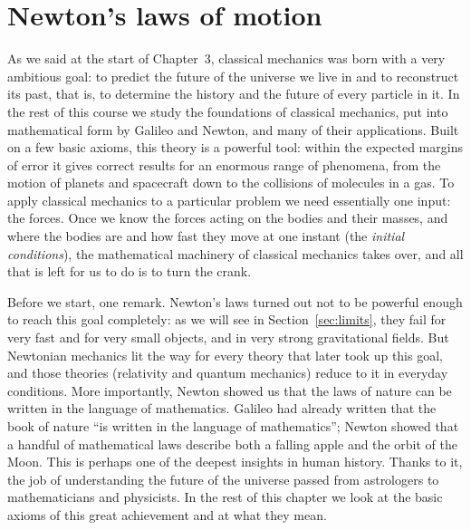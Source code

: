 \documentclass[11pt,a4paper]{article}
\begin{document}
\makenotetitle

\setcounter{section}{4}
\section{Newton's laws of motion}\label{sec:newton}

As we said at the start of Chapter~3, classical mechanics was born with a very ambitious goal: to
predict the future of the universe we live in and to reconstruct its past, that is, to determine
the history and the future of every particle in it. In the rest of this course we study the
foundations of classical mechanics, put into mathematical form by Galileo and Newton, and many of
their applications. Built on a few basic axioms, this theory is a powerful tool: within the
expected margins of error it gives correct results for an enormous range of phenomena, from the
motion of planets and spacecraft down to the collisions of molecules in a gas. To apply classical
mechanics to a particular problem we need essentially one input: the forces. Once we know the
forces acting on the bodies and their masses, and where the bodies are and how fast they move at
one instant (the \emph{initial conditions}), the mathematical machinery of classical mechanics takes
over, and all that is left for us to do is to turn the crank.

Before we start, one remark. Newton's laws turned out not to be powerful enough to reach this goal
completely: as we will see in Section~\ref{sec:limits}, they fail for very fast and for very small
objects, and in very strong gravitational fields. But Newtonian mechanics lit the way for every
theory that later took up this goal, and those theories (relativity and quantum mechanics) reduce
to it in everyday conditions. More
importantly, Newton showed us that the laws of nature can be written in the language of
mathematics. Galileo had already written that the book of nature ``is written in the language of
mathematics''; Newton showed that a handful of mathematical laws describe both a falling apple and
the orbit of the Moon. This is perhaps one of the deepest insights in human history. Thanks to it,
the job of understanding the future of the universe passed from astrologers to mathematicians and
physicists. In the rest of this chapter we look at the basic axioms of this great achievement and
at what they mean.

\end{document}
